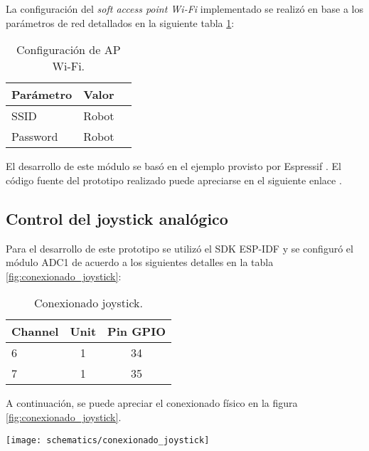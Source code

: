 La configuración del \textit{soft access point Wi-Fi} implementado se realizó en base a los parámetros de red detallados en la siguiente tabla  \ref{tab:configuracion_wifi}:

\vspace{0.5cm}
\begin{table}[h]
\centering
\caption[Configuración de AP WiFi]{Configuración de AP Wi-Fi.}
\begin{tabular}{l c c}
\toprule
\textbf{Parámetro} & \textbf{Valor} \\
\midrule
SSID & Robot  \\
Password & Robot  \\
\bottomrule
\hline
\end{tabular}
\label{tab:configuracion_wifi}
\end{table}


El desarrollo de este módulo se basó en el ejemplo provisto por Espressif \cite{ESP32_WiFi_SoftAP}. El código fuente del prototipo realizado puede apreciarse en el siguiente enlace \cite{ESP32_POC_WiFi}.


\subsection{Control del joystick analógico}
Para el desarrollo de este prototipo se utilizó el SDK ESP-IDF y se configuró el módulo ADC1 de acuerdo a los siguientes detalles en la tabla \ref{fig:conexionado_joystick}:

\vspace{0.5cm}
\begin{table}[h]
\centering
\caption[Conexionado joystick]{Conexionado joystick.}
\begin{tabular}{l c c}
\toprule
\textbf{Channel} & \textbf{Unit} & \textbf{Pin GPIO}\\
\midrule
6 & 1 & 34 \\
7 & 1 & 35 \\
\bottomrule
\hline
\end{tabular}
\label{tab:conexionado_joystick}
\end{table}

A continuación, se puede apreciar el conexionado físico en la figura \ref{fig:conexionado_joystick}.

\begin{center}
\texttt{[image: schematics/conexionado\_joystick]}
  \label{fig:conexionado_joystick}
\end{center}


